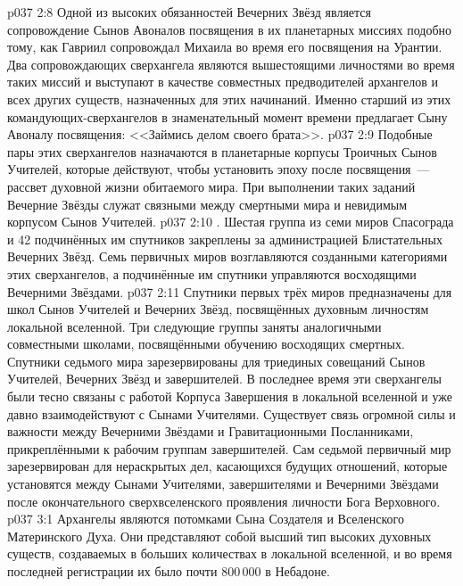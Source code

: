 \vs p037 2:8 Одной из высоких обязанностей Вечерних Звёзд является сопровождение Сынов Авоналов посвящения в их планетарных миссиях подобно тому, как Гавриил сопровождал Михаила во время его посвящения на Урантии. Два сопровождающих сверхангела являются вышестоящими личностями во время таких миссий и выступают в качестве совместных предводителей архангелов и всех других существ, назначенных для этих начинаний. Именно старший из этих командующих\hyp{}сверхангелов в знаменательный момент времени предлагает Сыну Авоналу посвящения: <<Займись делом своего брата>>.
\vs p037 2:9 Подобные пары этих сверхангелов назначаются в планетарные корпусы Троичных Сынов Учителей, которые действуют, чтобы установить эпоху после посвящения~--- рассвет духовной жизни обитаемого мира. При выполнении таких заданий Вечерние Звёзды служат связными между смертными мира и невидимым корпусом Сынов Учителей.
\vs p037 2:10 \pc {}. Шестая группа из семи миров Спасограда и 42 подчинённых им спутников закреплены за администрацией Блистательных Вечерних Звёзд. Семь первичных миров возглавляются созданными категориями этих сверхангелов, а подчинённые им спутники управляются восходящими Вечерними Звёздами.
\vs p037 2:11 Спутники первых трёх миров предназначены для школ Сынов Учителей и Вечерних Звёзд, посвящённых духовным личностям локальной вселенной. Три следующие группы заняты аналогичными совместными школами, посвящёнными обучению восходящих смертных. Спутники седьмого мира зарезервированы для триединых совещаний Сынов Учителей, Вечерних Звёзд и завершителей. В последнее время эти сверхангелы были тесно связаны с работой Корпуса Завершения в локальной вселенной и уже давно взаимодействуют с Сынами Учителями. Существует связь огромной силы и важности между Вечерними Звёздами и Гравитационными Посланниками, прикреплёнными к рабочим группам завершителей. Сам седьмой первичный мир зарезервирован для нераскрытых дел, касающихся будущих отношений, которые установятся между Сынами Учителями, завершителями и Вечерними Звёздами после окончательного сверхвселенского проявления личности Бога Верховного.
\vs p037 3:1 Архангелы являются потомками Сына Создателя и Вселенского  Материнского Духа. Они представляют собой высший тип высоких духовных существ, создаваемых в больших количествах в локальной вселенной, и во время последней регистрации их было почти 800\,000 в Небадоне.
